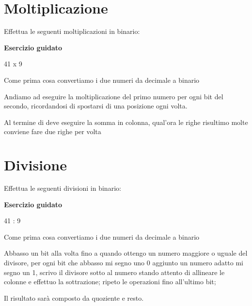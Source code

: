 \documentclass[11pt,fleqn]{book}
\begin{document}
\newpage

\section{Moltiplicazione}

Effettua le seguenti moltiplicazioni in binario:

\begin{esercizio}[1]
    \textbf{Esercizio guidato}

    41 x 9

    Come prima cosa convertiamo i due numeri da decimale a binario

    \immediate{}
    

    \immediate{}
    

    Andiamo ad eseguire la moltiplicazione del primo numero per ogni bit del secondo, ricordandosi di spostarsi di una posizione ogni volta.

    Al termine di deve eseguire la somma in colonna, qual'ora le righe risultimo molte conviene fare due righe per volta

    \immediate{}
    

\end{esercizio}

\newpage


\newpage

\section{Divisione}

Effettua le seguenti divisioni in binario:

\begin{esercizio}[1]
    \textbf{Esercizio guidato}

    41 : 9

    Come prima cosa convertiamo i due numeri da decimale a binario

    \immediate{}
    

    \immediate{}
    

    Abbasso un bit alla volta fino a quando ottengo un numero maggiore o uguale del divisore, per ogni bit che abbasso mi segno uno 0 aggiunto un numero adatto mi segno un 1, scrivo il divisore sotto al numero stando attento di allineare le colonne e effettuo la sottrazione; ripeto le operazioni fino all'ultimo bit; 
    
    Il risultato sarà composto da quoziente e resto.

    \immediate{}
    
\end{esercizio}
\end{document}
